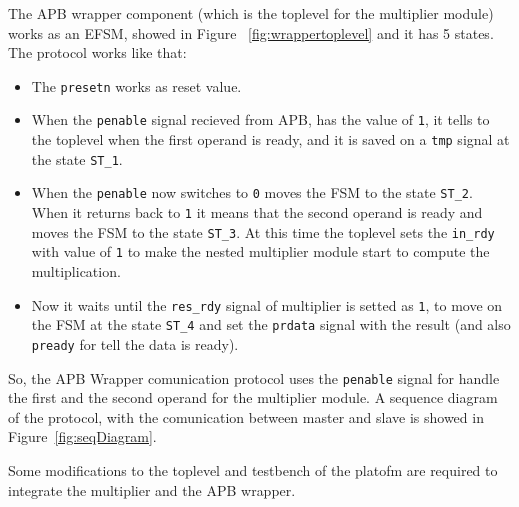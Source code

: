 \documentclass[]{IEEEtran}
\begin{document}
The APB wrapper component (which is the toplevel for the multiplier module) works as an EFSM, showed in Figure ~\ref{fig:wrappertoplevel} and it has 5 states. The protocol works like that:
\begin{itemize}
	\item The \verb|presetn| works as reset value.
	\item When the \verb|penable| signal recieved from APB, has the value of \verb|1|, it tells to the toplevel when the first operand is ready, and it is saved on a \verb|tmp| signal at the state \verb|ST_1|.
	\item When the \verb|penable| now switches to \verb|0| moves the FSM to the state \verb|ST_2|. When it returns back to \verb|1| it means that the second operand is ready and moves the FSM to the state \verb|ST_3|. At this time the toplevel sets the \verb|in_rdy| with value of \verb|1| to make the nested multiplier module start to compute the multiplication.
	\item Now it waits until the \verb|res_rdy| signal of multiplier is setted as \verb|1|, to move on the FSM at the state \verb|ST_4| and set the \verb|prdata| signal with the result (and also \verb|pready| for tell the data is ready).
\end{itemize}
So, the APB Wrapper comunication protocol uses the \verb|penable| signal for handle the first and the second operand for the multiplier module. A sequence diagram of the protocol, with the comunication between master and slave is showed in Figure~\ref{fig:seqDiagram}.

Some modifications to the toplevel and testbench of the platofm are required to integrate the multiplier and the APB wrapper. 
\end{document}
